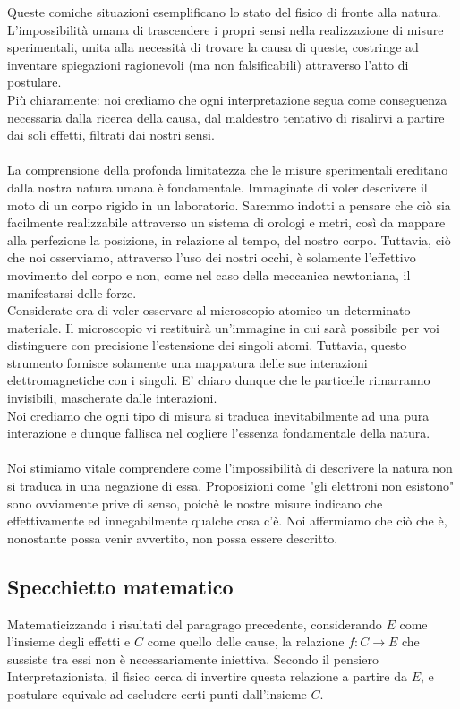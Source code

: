 \documentclass[]{article}
\begin{document}
	Queste comiche situazioni esemplificano lo stato del fisico di fronte alla natura. L'impossibilità umana di trascendere i propri sensi nella realizzazione di misure sperimentali, unita alla necessità di trovare la causa di queste, costringe ad inventare spiegazioni ragionevoli (ma non falsificabili) attraverso l'atto di postulare. \\
	Più chiaramente: noi crediamo che ogni interpretazione segua come conseguenza necessaria dalla ricerca della causa, dal maldestro tentativo di risalirvi a partire dai soli effetti, filtrati dai nostri sensi.\\
	\\
	La comprensione della profonda limitatezza che le misure sperimentali ereditano dalla nostra natura umana è fondamentale. Immaginate di voler descrivere il moto di un corpo rigido in un laboratorio. Saremmo indotti a pensare che ciò sia facilmente realizzabile attraverso un sistema di orologi e metri, così da mappare alla perfezione la posizione, in relazione al tempo, del nostro corpo. Tuttavia, ciò che noi osserviamo, attraverso l'uso dei nostri occhi, è solamente l'effettivo movimento del corpo e non, come nel caso della meccanica newtoniana, il manifestarsi delle forze. \\
	Considerate ora di voler osservare al microscopio atomico un determinato materiale. Il microscopio vi restituirà un'immagine in cui sarà possibile per voi distinguere con precisione l'estensione dei singoli atomi. Tuttavia, questo strumento fornisce solamente una mappatura delle sue interazioni elettromagnetiche con i singoli. E' chiaro dunque che  le particelle rimarranno invisibili, mascherate dalle interazioni.\\
	Noi crediamo che ogni tipo di misura si traduca inevitabilmente ad una pura interazione e dunque fallisca nel cogliere l'essenza fondamentale della natura.\\
	\\ 
	Noi stimiamo vitale comprendere come l'impossibilità di descrivere la natura non si traduca in una negazione di essa. Proposizioni come "gli elettroni non esistono" sono ovviamente prive di senso, poichè le nostre misure indicano che effettivamente ed innegabilmente qualche cosa c'è. Noi affermiamo che ciò che è, nonostante possa venir avvertito, non possa essere descritto.
	\subsection{Specchietto matematico}
	Matematicizzando i risultati del paragrago precedente, considerando $E$ come l'insieme degli effetti e $C$ come quello delle cause, la relazione $f:C\rightarrow E$ che sussiste tra essi non è necessariamente iniettiva. Secondo il pensiero Interpretazionista, il fisico cerca di invertire questa relazione a partire da $E$, e postulare equivale ad escludere certi punti dall'insieme $C$.
\end{document}
